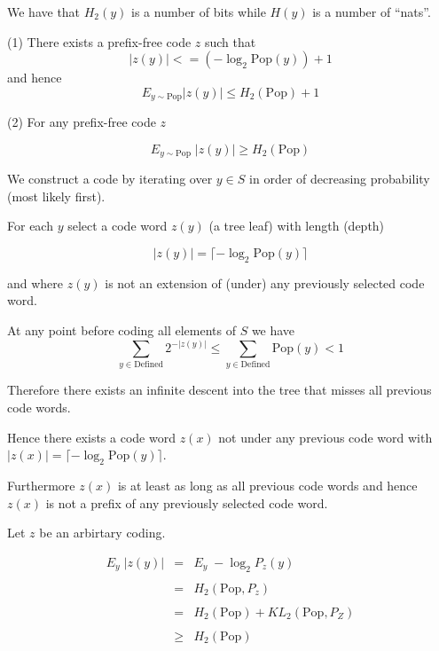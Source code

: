 {\vfill
We have that $H_2(y)$ is a number of bits while $H(y)$ is a number of ``nats''.


(1) There exists a prefix-free code $z$ such that
$$|z(y)| <= (- \log_2 \mathrm{Pop}(y)) + 1$$
and hence
$$E_{y\sim \mathrm{Pop}} |z(y)| \leq H_2(\mathrm{Pop}) +1$$

\vfill
(2) For any prefix-free code $z$

$$E_{y \sim \mathrm{Pop}}\;|z(y)| \geq H_2(\mathrm{Pop})$$


\vfill
We construct a code by iterating over $y \in S$ in order of decreasing probability (most likely first).

\vfill
For each $y$ select a code word $z(y)$ (a tree leaf) with length (depth)

\vfill
$$|z(y)| = \lceil - \log_2 \mathrm{Pop}(y)\rceil$$

\vfill
and where $z(y)$ is not an extension of (under) any previously selected code word.


At any point before coding all elements of $S$ we have
$$\sum_{y \in \mathrm{Defined}} 2^{-|z(y)|} \leq \sum_{y \in \mathrm{Defined}} \mathrm{Pop}(y) < 1$$

\vfill
Therefore there exists an infinite descent into the tree that misses all previous code words.

\vfill
Hence there exists a code word $z(x)$ not under any previous code word with
$|z(x)| = \lceil - \log_2 \mathrm{Pop}(y)\rceil$.

\vfill
Furthermore $z(x)$ is at least as long as all previous code words and hence $z(x)$ is not a prefix of any previously selected code word.


Let $z$ be an arbirtary coding.

\begin{eqnarray*}
E_y\;|z(y)| & = & E_y\; -\log_2 P_z(y) \\
\\
 & = & H_2(\mathrm{Pop},P_z) \\
 \\
 &= & H_2(\mathrm{Pop}) + KL_2(\mathrm{Pop},P_Z) \\
 \\
 &\geq & H_2(\mathrm{Pop})
\end{eqnarray*}
 
}
